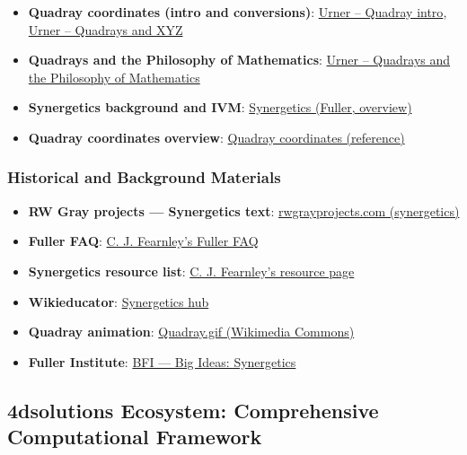 \documentclass[
  10pt,
]{article}
\providecommand{\tightlist}{%
  \setlength{\itemsep}{0pt}\setlength{\parskip}{0pt}}
\begin{document}
\begin{itemize}
\tightlist
\item
  \textbf{Quadray coordinates (intro and conversions)}:
  \href{https://www.grunch.net/synergetics/quadintro.html}{Urner --
  Quadray intro},
  \href{https://www.grunch.net/synergetics/quadxyz.html}{Urner --
  Quadrays and XYZ}
\item
  \textbf{Quadrays and the Philosophy of Mathematics}:
  \href{https://www.grunch.net/synergetics/quadphil.html}{Urner --
  Quadrays and the Philosophy of Mathematics}
\item
  \textbf{Synergetics background and IVM}:
  \href{https://en.wikipedia.org/wiki/Synergetics_(Fuller)}{Synergetics
  (Fuller, overview)}
\item
  \textbf{Quadray coordinates overview}:
  \href{https://en.wikipedia.org/wiki/Quadray_coordinates}{Quadray
  coordinates (reference)}
\end{itemize}

\hypertarget{historical-and-background-materials}{%
\subsubsection{Historical and Background
Materials}\label{historical-and-background-materials}}

\begin{itemize}
\tightlist
\item
  \textbf{RW Gray projects --- Synergetics text}:
  \href{http://www.rwgrayprojects.com/synergetics/s00/p0000.html}{rwgrayprojects.com
  (synergetics)}
\item
  \textbf{Fuller FAQ}:
  \href{https://www.cjfearnley.com/fuller-faq.pdf}{C. J. Fearnley's
  Fuller FAQ}
\item
  \textbf{Synergetics resource list}:
  \href{https://www.cjfearnley.com/fuller-faq-2.html}{C. J. Fearnley's
  resource page}
\item
  \textbf{Wikieducator}:
  \href{https://wikieducator.org/Synergetics}{Synergetics hub}
\item
  \textbf{Quadray animation}:
  \href{https://commons.wikimedia.org/wiki/File:Quadray.gif}{Quadray.gif
  (Wikimedia Commons)}
\item
  \textbf{Fuller Institute}:
  \href{https://www.bfi.org/about-fuller/big-ideas/synergetics/}{BFI ---
  Big Ideas: Synergetics}
\end{itemize}

\hypertarget{dsolutions-ecosystem-comprehensive-computational-framework}{%
\subsection{4dsolutions Ecosystem: Comprehensive Computational
Framework}\label{dsolutions-ecosystem-comprehensive-computational-framework}}
\end{document}
